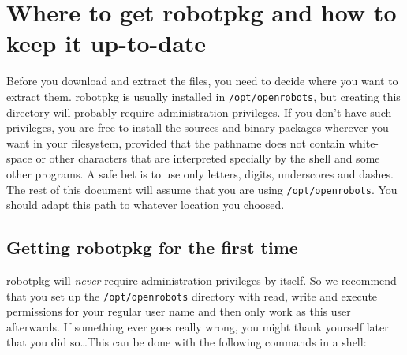 %
%
%
%
%

\section{Where to get robotpkg and how to keep it up-to-date} %
\label{section:getting}

Before you download and extract the files, you need to decide where you want to
extract  them.  robotpkg is  usually installed  in  {\tt /opt/openrobots},  but
creating this directory will probably   require administration privileges.   If
you don't have such privileges, you are free to  install the sources and binary
packages wherever you want in your filesystem, provided  that the pathname does
not contain white-space or other  characters that are interpreted specially  by
the shell and some other programs.  A safe bet is to  use only letters, digits,
underscores  and dashes. The rest of  this  document will  assume  that you are
using {\tt  /opt/openrobots}.  You should adapt  this path to whatever location
you choosed.


\subsection{Getting robotpkg for the first time} %

robotpkg  will {\em never} require administration  privileges by itself.  So we
recommend that you set up the {\tt  /opt/openrobots} directory with read, write
and execute permissions for your regular user  name and then  only work as this
user afterwards. If something ever goes really  wrong, you might thank yourself
later that you did so\ldots This  can be done with  the following commands in a
shell:

